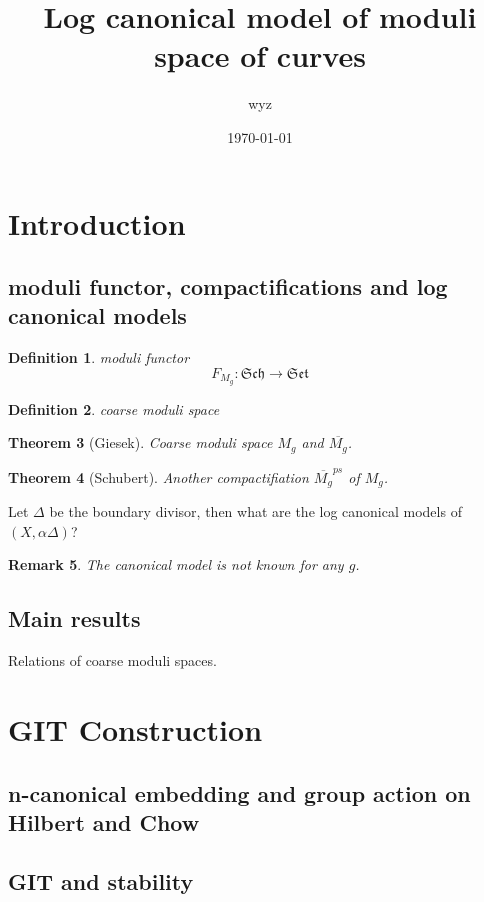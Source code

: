 \documentclass{article}
\title{Log canonical model of moduli space of curves}
\author{wyz}
\date{\today}
\newtheorem{defn}{Definition}[section]
\newtheorem{thm}[defn]{Theorem}
\newtheorem{rmk}[defn]{Remark}
\begin{document}
\maketitle
\tableofcontents
\section{Introduction}
\subsection{moduli functor, compactifications and log canonical models}
\begin{defn}
	moduli functor
	\[
		F_{M_{g}}: \mathfrak{Sch} \to \mathfrak{Set}
	\]
\end{defn}
\begin{defn}
	coarse moduli space
\end{defn}

\begin{thm}[Giesek]
	Coarse moduli space $M_{g}$ and $ \overline{M_{g}}$.
\end{thm}

\begin{thm}[Schubert]
	Another compactifiation $ \overline{M_{g}}^{ps}$ of $M_{g}$.
\end{thm}

Let $\Delta$ be the boundary divisor, then what are the log canonical models of $(X,\alpha\Delta)$?
\begin{rmk}
	The canonical model is not known for any $g$.
\end{rmk}

\subsection{Main results}
Relations of coarse moduli spaces.

\section{GIT Construction}

\subsection{n-canonical embedding and group action on Hilbert and Chow}

\subsection{GIT and stability}
\end{document}

